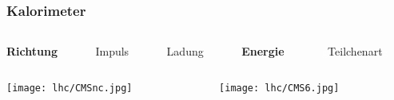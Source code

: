 \begin{frame}[t]
  \vskip0.3cm
  \frametitle{Kalorimeter}
  \begin{columns}
    \begin{column}{0.18\textwidth}
      \begin{block}{}
        \centering
        \textbf{Richtung}
      \end{block}
    \end{column}
    \begin{column}{0.025\textwidth}
    \end{column}
    \begin{column}{0.18\textwidth}
      \begin{block}{}
        \centering
        Impuls        
      \end{block}
    \end{column}
    \begin{column}{0.025\textwidth}
    \end{column}
    \begin{column}{0.18\textwidth}
      \begin{block}{}
        \centering
        Ladung
      \end{block}
    \end{column}
    \begin{column}{0.025\textwidth}
    \end{column}
    \begin{column}{0.18\textwidth}
      \begin{block}{}
        \centering
        \textbf{Energie}
      \end{block}
    \end{column}
    \begin{column}{0.02\textwidth}
    \end{column}
    \begin{column}{0.18\textwidth}
      \begin{block}{}
        \centering
        \textcolor{white}{g}Teilchenart\textcolor{white}{g}
      \end{block}
    \end{column}
    \begin{column}{0.005\textwidth}
    \end{column}
  \end{columns}
  \vskip0.25cm
  \begin{columns}
    \begin{column}{0.4\textwidth}
      \centering
      \texttt{[image: lhc/CMSnc.jpg]}
    \end{column}
    \begin{column}{0.6\textwidth}
      \centering
      \texttt{[image: lhc/CMS6.jpg]}
    \end{column}    
  \end{columns}
\end{frame}


